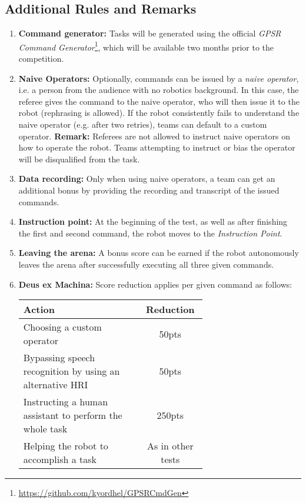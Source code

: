 %
%
\subsection*{Additional Rules and Remarks}
\begin{enumerate}[nosep]
	\item \textbf{Command generator:} Tasks will be generated using the official \emph{GPSR Command Generator}\footnote{\url{https://github.com/kyordhel/GPSRCmdGen}}, which will be available two months prior to the competition.

	\item \textbf{Naive Operators:} Optionally, commands can be issued by a \emph{naive operator}, i.e. a person from the audience with no robotics background.
	In this case, the referee gives the command to the naive operator, who will then issue it to the robot (rephrasing is allowed).
	If the robot consistently fails to understand the naive operator (e.g. after two retries), teams can default to a custom operator.
	\textbf{Remark:} Referees are not allowed to instruct naive operators on how to operate the robot.
	Teams attempting to instruct or bias the operator will be disqualified from the task.

	\item \textbf{Data recording:} Only when using naive operators, a team can get an additional bonus by providing the recording and transcript of the issued commands.

	\item \textbf{Instruction point:} At the beginning of the test, as well as after finishing the first and second command, the robot moves to the \textit{Instruction Point}.

	\item \textbf{Leaving the arena:} A bonus score can be earned if the robot autonomously leaves the arena after successfully executing all three given commands.

	\item \textbf{Deus ex Machina:} Score reduction applies per given command as follows:
	\begin{table}[h]
		\begin{tabular}{m{0.65\linewidth} c}
			\textbf{Action} & \textbf{Reduction} \\\hline
			Choosing a custom operator & 50pts \\
			Bypassing speech recognition by using an alternative HRI & 50pts \\
			Instructing a human assistant to perform the whole task & 250pts \\
			Helping the robot to accomplish a task & As in other \SONE{} tests \\\hline
		\end{tabular}
	\end{table}
\end{enumerate}

